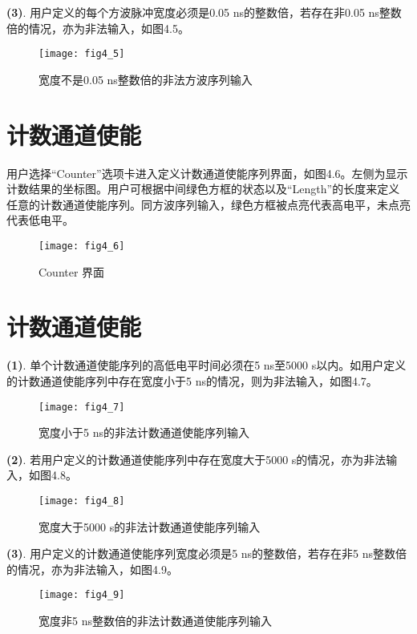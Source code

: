 \noindent \textbf{(3)}. 用户定义的每个方波脉冲宽度必须是0.05 ns的整数倍，若存在非0.05 ns整数倍的情况，亦为非法输入，如图4.5。
\begin{figure}[H]
\centering
\texttt{[image: fig4\_5]}
\caption{宽度不是0.05 ns整数倍的非法方波序列输入}
\end{figure}

\section{计数通道使能}
用户选择“Counter”选项卡进入定义计数通道使能序列界面，如图4.6。左侧为显示计数结果的坐标图。用户可根据中间绿色方框的状态以及“Length”的长度来定义任意的计数通道使能序列。同方波序列输入，绿色方框被点亮代表高电平，未点亮代表低电平。
\begin{figure}[ht]
\centering
\texttt{[image: fig4\_6]}
\caption{Counter 界面}
\end{figure}

\section{计数通道使能}
\noindent \textbf{(1)}.  单个计数通道使能序列的高低电平时间必须在5 ns至5000 s以内。如用户定义的计数通道使能序列中存在宽度小于5 ns的情况，则为非法输入，如图4.7。
\begin{figure}[ht]
\centering
\texttt{[image: fig4\_7]}
\caption{宽度小于5 ns的非法计数通道使能序列输入}
\end{figure}

\newpage
\noindent \textbf{(2)}.  若用户定义的计数通道使能序列中存在宽度大于5000 s的情况，亦为非法输入，如图4.8。
\begin{figure}[ht]
\centering
\texttt{[image: fig4\_8]}
\caption{宽度大于5000 s的非法计数通道使能序列输入}
\end{figure}

\noindent \textbf{(3)}.  用户定义的计数通道使能序列宽度必须是5 ns的整数倍，若存在非5 ns整数倍的情况，亦为非法输入，如图4.9。
\begin{figure}[ht]
\centering
\texttt{[image: fig4\_9]}
\caption{宽度非5 ns整数倍的非法计数通道使能序列输入}
\end{figure}

